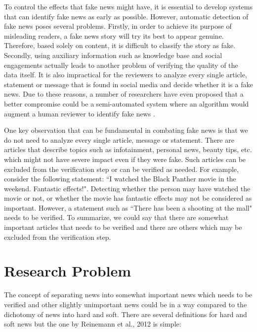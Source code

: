 To control the effects that fake news might have, it is essential to develop systems that can identify fake news as early as possible. However, automatic detection of fake news poses several problems. Firstly, in order to achieve its purpose of misleading readers, a fake news story will try its best to appear genuine. Therefore, based solely on content, it is difficult to classify the story as fake. Secondly, using auxiliary information such as knowledge base and social engagements actually leads to another problem of verifying the quality of the data itself\cite{shu2017fake}. It is also impractical for the reviewers to analyze every single article, statement or message that is found in social media and decide whether it is a fake news. Due to these reasons, a number of researchers have even proposed that a better compromise could be a semi-automated system where an algorithm would augment a human reviewer to identify fake news \cite{conroy2015automatic, chen2015news, wiegand2016veracity}.

One key observation that can be fundamental in combating fake news is that we do not need to analyze every single article, message or statement. There are articles that describe topics such as infotainment, personal news, beauty tips, etc. which might not have severe impact even if they were fake. Such articles can be excluded from the verification step or can be verified as needed. For example, consider the following statement: ``I watched the Black Panther movie in the weekend. Fantastic effects!". Detecting whether the person may have watched the movie or not, or whether the movie has fantastic effects may not be considered as important. However, a statement such as ``There has been a shooting at the mall" needs to be verified.
To summarize, we could say that there are somewhat important articles that needs to be verified and there are others which may be excluded from the verification step.

\section{Research Problem} \label{intro:research}
The concept of separating news into somewhat important news which needs to be verified and other slightly unimportant news could be in a way compared to the dichotomy of news into hard and soft. There are several definitions for hard and soft news \cite{reinemann2012hard, shoemaker2012news} but the one by Reinemann et al., 2012 is simple: 

